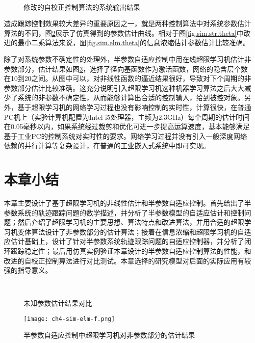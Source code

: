\begin{figure}[!htb]
	\centering
	\\
	\caption{修改的自校正控制算法的系统输出结果}
	\label{fig.sim.str.sys}
\end{figure}

造成跟踪控制效果较大差异的重要原因之一，就是两种控制算法中对系统参数估计算法的不同，图\ref{fig.sim.str.sys}展示了仿真得到的参数估计曲线。相对于图\ref{fig.sim.str.theta}中改进的最小二乘算法来说，图\ref{fig.sim.elm.theta}的信息浓缩估计参数估计比较准确。

除了对系统参数不确定性的处理外，半参数自适应控制中用在线超限学习机估计非参数部分，估计结果如图\ref{fig:4.sim.elm.f}，选择了径向基函数作为激活函数，网络的隐含层个数在10到20之间。从图中可以，对非线性函数的逼近结果很好，导致对下个周期的非参数部分估计比较准确。这充分说明引入超限学习机这种机器学习算法之后大大减少了系统的非参数不确定性，从而能够计算出合适的控制输入，给到被控对象。另外，基于超限学习机的网络学习过程也没有影响控制的实时性，计算很快，在普通PC机上（实验计算机配置为Intel i5处理器，主频为2.3GHz）每个周期的估计时间在0.05毫秒以内，如果系统经过裁剪和优化可进一步提高运算速度，基本能够满足基于工业PC的控制系统对实时性的要求。网络学习过程并没有引入一般深度网络依赖的并行计算等复杂设计，在普通的工业嵌入式系统中即可实现。

\section{本章小结}\label{sect:4.5}
本章主要设计了基于超限学习机的非线性估计和半参数自适应控制。首先给出了半参数系统的轨迹跟踪问题的数学描述，并分析了半参数模型的自适应估计和控制问题；然后介绍了超限学习机的主要思想、算法特点和改进算法，并用合适的超限学习机变体算法设计了非参数部分的估计算法；接着在信息浓缩和超限学习机的自适应估计基础上，设计了针对半参数系统轨迹跟踪问题的自适应控制器，并分析了闭环跟踪稳定性；最后用仿真实例验证本章设计的半参数自适应控制算法的性能，和改进的自校正控制算法进行对比测试。本章选择的研究模型对后面的实际应用有较强的指导意义。

\begin{figure}[!htb]
	\centering
	\\
	\caption{未知参数估计结果对比}
	\label{fig.sim.str.sys}
\end{figure}

\begin{figure}[!htb]
  \centering
  \texttt{[image: ch4-sim-elm-f.png]}\\
  \caption{半参数自适应控制中超限学习机对非参数部分的估计结果}
  \label{fig:4.sim.elm.f}
\end{figure}